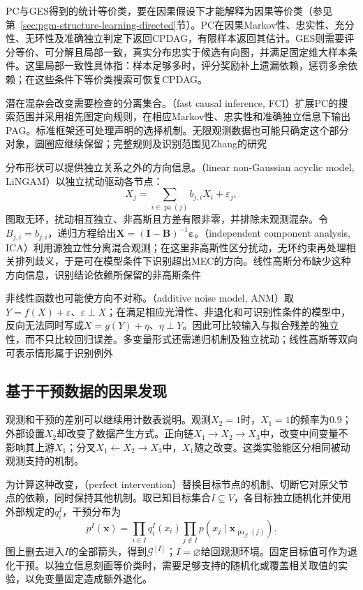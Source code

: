 PC与GES得到的统计等价类，要在因果假设下才能解释为因果等价类（参见第~\ref{sec:pgm-structure-learning-directed}节）。PC在因果Markov性、忠实性、充分性、无环性及准确独立判定下返回CPDAG，有限样本返回其估计。GES则需要评分等价、可分解且局部一致，真实分布忠实于候选有向图，并满足固定维大样本条件。这里局部一致性具体指：样本足够多时，评分奖励补上遗漏依赖，惩罚多余依赖；在这些条件下等价类搜索可恢复CPDAG。

潜在混杂会改变需要检查的分离集合。（fast causal inference, FCI）扩展PC的搜索范围并采用祖先图定向规则，在相应Markov性、忠实性和准确独立信息下输出PAG。标准框架还可处理声明的选择机制。无限观测数据也可能只确定这个部分对象，圆圈应继续保留；完整规则及识别范围见Zhang的研究

分布形状可以提供独立关系之外的方向信息。（linear non-Gaussian acyclic model, LiNGAM）以独立扰动驱动各节点：
\[
  X_j=\sum_{i\in\operatorname{pa}(j)}b_{j,i}X_i+\varepsilon_j,
\]
图取无环，扰动相互独立、非高斯且方差有限非零，并排除未观测混杂。令$B_{j,i}=b_{j,i}$，递归方程给出$\bm{X}=(\bm{I}-\bm{B})^{-1}\bm{\varepsilon}$。（independent component analysis, ICA）利用源独立性分离混合观测；在这里非高斯性区分扰动，无环约束再处理相关排列歧义，于是可在模型条件下识别超出MEC的方向。线性高斯分布缺少这种方向信息，识别结论依赖所保留的非高斯条件

非线性函数也可能使方向不对称。（additive noise model, ANM）取$Y=f(X)+\varepsilon$、$\varepsilon\perp X$；在满足相应光滑性、非退化和可识别性条件的模型中，反向无法同时写成$X=g(Y)+\eta$、$\eta\perp Y$。因此可比较输入与拟合残差的独立性，而不只比较回归误差。多变量形式还需递归机制及独立扰动；线性高斯等双向可表示情形属于识别例外

\subsection{基于干预数据的因果发现}
\label{sec:pgm-structure-learning-interventional}

观测和干预的差别可以继续用计数表说明。观测$X_2=1$时，$X_1=1$的频率为$0.9$；外部设置$X_2$却改变了数据产生方式。正向链$X_1\to X_2\to X_3$中，改变中间变量不影响其上游$X_1$；分叉$X_1\leftarrow X_2\to X_3$中，$X_1$随之改变。这类实验能区分相同被动观测支持的机制。

为计算这种改变，（perfect intervention）替换目标节点的机制、切断它对原父节点的依赖，同时保持其他机制。取已知目标集合$I\subseteq V$，各目标独立随机化并使用外部规定的$q_i^I$，干预分布为
\begin{equation}
  p^I(\bm{x})
  =\prod_{i\in I}q_i^I(x_i)
   \prod_{j\notin I}
      p(x_j\mid\bm{x}_{\operatorname{pa}_{\mathcal{G}}(j)}).
  \label{eq:pgm-structure-learning-intervention}
\end{equation}
图上删去进入$I$的全部箭头，得到$\mathcal{G}^{[I]}$；$I=\varnothing$给回观测环境。固定目标值可作为退化干预。以独立信息刻画等价类时，需要足够支持的随机化或覆盖相关取值的实验，以免变量固定造成额外退化。

